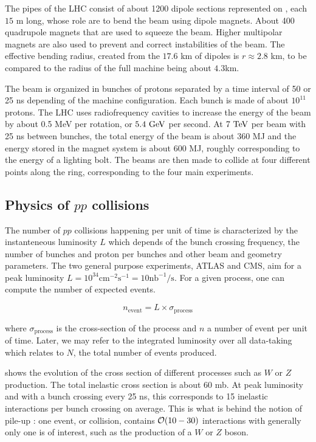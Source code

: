     The pipes of the LHC consist of about 1200 dipole sections represented on
    , each $15$ m long, whose role are to bend the beam using dipole
    magnets. About 400 quadrupole magnets that are used to squeeze the
    beam. Higher multipolar magnets are also used to prevent and correct instabilities of
    the beam. The effective bending radius, created from the $17.6$ km of dipoles is
    $r \approx 2.8$ km, to be compared to the radius of the full machine being about $4.3$km.

    The beam is organized in bunches of protons separated by a time interval of 50 or
    25 ns depending of the machine configuration. Each bunch is made of about $10^{11}$
    protons. The LHC uses radiofrequency cavities to increase the energy of the beam by
    about 0.5 MeV per rotation, or $5.4~\text{GeV}$ per second. At $7~\text{TeV}$ per beam with 25 ns
    between bunches, the total energy of the beam is about 360 MJ and the energy stored
    in the magnet system is about 600 MJ, roughly corresponding to the energy of a
    lighting bolt. The beams are then made to collide at four different points along the
    ring, corresponding to the four main experiments.

        \subsection{Physics of $pp$ collisions \label{sec:physicsFromCollisionsAtTheLHC}}

    The number of $pp$ collisions happening per unit of time is characterized by the
    instanteneous luminosity $L$ which depends of the bunch crossing frequency, the
    number of bunches and proton per bunches and other beam and geometry parameters.
    The two general purpose experiments, ATLAS and CMS, aim for a peak luminosity
    $ L = 10^{34} \text{cm}^{-2} \text{s}^{-1} = 10 \text{nb}^{-1} / \text{s}$. For a
    given process, one can compute the number of expected events.

    $$ n_\text{event} = L \times \sigma_\text{process} $$

    where $\sigma_\text{process}$ is the cross-section of the process and $n$ a number
    of event per unit of time. Later, we may refer to the integrated luminosity over all
    data-taking which relates to $N$, the total number of events produced.

     shows the evolution of the cross section of different
    processes such as $W$ or $Z$ production. The total inelastic cross section is about
    60 mb. At peak luminosity and with a bunch crossing every 25 ns, this corresponds
    to 15 inelastic interactions per bunch crossing on average. This is what is behind
    the notion of pile-up : one event, or collision, contains $\mathcal{O}(10-30)$
    interactions with generally only one is of interest, such as the production of a $W$
    or $Z$ boson.

